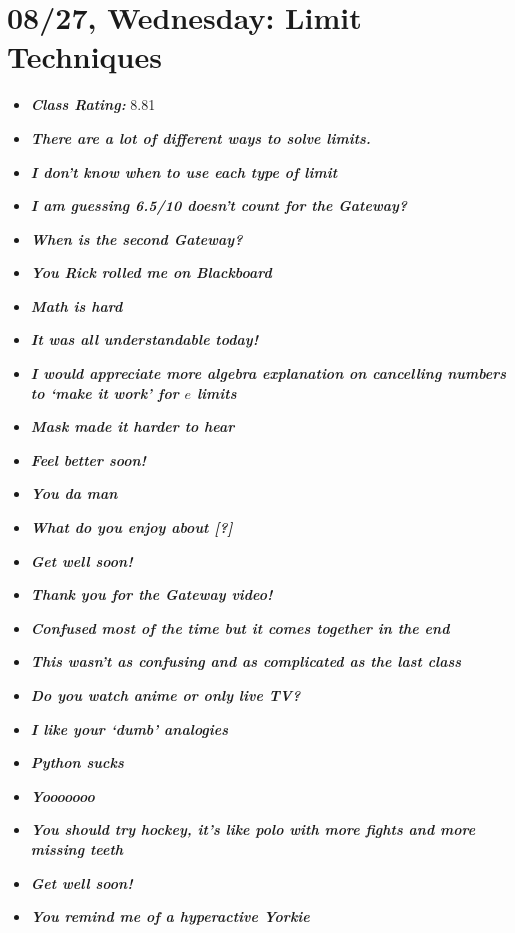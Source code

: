 \documentclass[11pt,letterpaper]{article}
\begin{document}
\newpage
\section*{08/27, Wednesday: Limit Techniques\label{08-27}}

\begin{itemize}
\item {\bfseries\itshape Class Rating:} 8.81
\item {\bfseries\itshape There are a lot of different ways to solve limits.}
\item {\bfseries\itshape I don't know when to use each type of limit}
\item {\bfseries\itshape I am guessing 6.5/10 doesn't count for the Gateway?}
\item {\bfseries\itshape When is the second Gateway?}
\item {\bfseries\itshape You Rick rolled me on Blackboard}
\item {\bfseries\itshape Math is hard}
\item {\bfseries\itshape It was all understandable today!}
\item {\bfseries\itshape I would appreciate more algebra explanation on cancelling numbers to `make it work' for $e$ limits}
\item {\bfseries\itshape Mask made it harder to hear}
\item {\bfseries\itshape Feel better soon!}
\item {\bfseries\itshape You da man}
\item {\bfseries\itshape What do you enjoy about [?]} 
\item {\bfseries\itshape Get well soon!}
\item {\bfseries\itshape Thank you for the Gateway video!}
\item {\bfseries\itshape Confused most of the time but it comes together in the end}
\item {\bfseries\itshape This wasn't as confusing and as complicated as the last class}
\item {\bfseries\itshape Do you watch anime or only live TV?}
\item {\bfseries\itshape I like your `dumb' analogies}
\item {\bfseries\itshape Python sucks}
\item {\bfseries\itshape Yooooooo}
\item {\bfseries\itshape You should try hockey, it's like polo with more fights and more missing teeth}
\item {\bfseries\itshape Get well soon!}
\item {\bfseries\itshape You remind me of a hyperactive Yorkie} %
\end{itemize}
\end{document}

